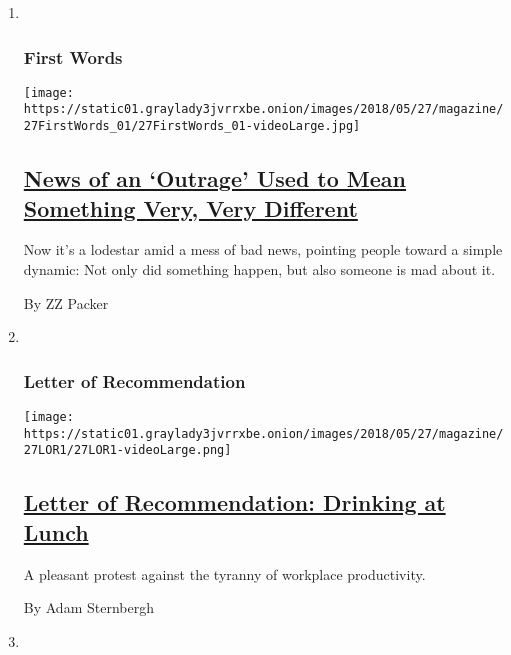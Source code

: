 \begin{enumerate}
\def\labelenumi{\arabic{enumi}.}
\item ~
  \hypertarget{first-words}{%
  \subsubsection{First Words}\label{first-words}}

  \texttt{[image: https://static01.graylady3jvrrxbe.onion/images/2018/05/27/magazine/27FirstWords\_01/27FirstWords\_01-videoLarge.jpg]}

  \hypertarget{news-of-an-outrage-used-to-mean-something-very-very-different}{%
  \subsection{\texorpdfstring{\href{/2018/05/23/magazine/news-of-an-outrage-used-to-mean-something-very-very-different.html}{News
  of an `Outrage' Used to Mean Something Very, Very
  Different}}{News of an `Outrage' Used to Mean Something Very, Very Different}}\label{news-of-an-outrage-used-to-mean-something-very-very-different}}

  Now it's a lodestar amid a mess of bad news, pointing people toward a
  simple dynamic: Not only did something happen, but also someone is mad
  about it.

  By ZZ Packer
\item ~
  \hypertarget{letter-of-recommendation}{%
  \subsubsection{Letter of
  Recommendation}\label{letter-of-recommendation}}

  \texttt{[image: https://static01.graylady3jvrrxbe.onion/images/2018/05/27/magazine/27LOR1/27LOR1-videoLarge.png]}

  \hypertarget{letter-of-recommendation-drinking-at-lunch}{%
  \subsection{\texorpdfstring{\href{/2018/05/23/magazine/letter-of-recommendation-drinking-at-lunch.html}{Letter
  of Recommendation: Drinking at
  Lunch}}{Letter of Recommendation: Drinking at Lunch}}\label{letter-of-recommendation-drinking-at-lunch}}

  A pleasant protest against the tyranny of workplace productivity.

  By Adam Sternbergh
\item ~
  \hypertarget{eat}{%
}
\end{enumerate}

